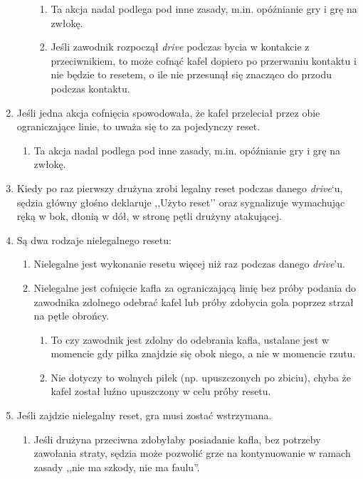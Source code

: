 \documentclass[11pt,a4paper]{article}
\begin{document}
\begin{enumerate}
\begin{enumerate}
    \begin{enumerate}
    
    \item
      Ta akcja nadal podlega pod inne zasady, m.in. opóźnianie gry i grę
      na zwłokę.
    \item
      Jeśli zawodnik rozpoczął \emph{drive} podczas bycia w kontakcie z
      przeciwnikiem, to może cofnąć kafel dopiero po przerwaniu kontaktu
      i nie będzie to resetem, o ile nie przesunął się znacząco do
      przodu podczas kontaktu.
    \end{enumerate}
  \end{enumerate}
\item
  Jeśli jedna akcja cofnięcia spowodowała, że kafel przeleciał przez
  obie ograniczające linie, to uważa się to za pojedynczy reset.

  \begin{enumerate}
  
  \item
    Ta akcja nadal podlega pod inne zasady, m.in. opóźnianie gry i grę
    na zwłokę.
  \end{enumerate}
\item
  Kiedy po raz pierwszy drużyna zrobi legalny reset podczas danego
  \emph{drive}`u, sędzia główny głośno deklaruje ,,Użyto reset'' oraz
  sygnalizuje wymachując ręką w bok, dłonią w dół, w stronę pętli
  drużyny atakującej.
\item
  Są dwa rodzaje nielegalnego resetu:

  \begin{enumerate}
  
  \item
    Nielegalne jest wykonanie resetu więcej niż raz podczas danego
    \emph{drive}'u.
  \item
    Nielegalne jest cofnięcie kafla za ograniczającą linię bez próby
    podania do zawodnika zdolnego odebrać kafel lub próby zdobycia gola
    poprzez strzał na pętle obrońcy.

    \begin{enumerate}
    
    \item
      To czy zawodnik jest zdolny do odebrania kafla, ustalane jest w
      momencie gdy piłka znajdzie się obok niego, a nie w momencie
      rzutu.
    \item
      Nie dotyczy to wolnych piłek (np. upuszczonych po zbiciu), chyba
      że kafel został luźno upuszczony w celu próby resetu.
    \end{enumerate}
  \end{enumerate}
\item
  Jeśli zajdzie nielegalny reset, gra musi zostać wstrzymana.

  \begin{enumerate}
  
  \item
    Jeśli drużyna przeciwna zdobyłaby posiadanie kafla, bez potrzeby
    zawołania straty, sędzia może pozwolić grze na kontynuowanie w
    ramach zasady ,,nie ma szkody, nie ma faulu''.
  \end{enumerate}
\end{enumerate}
\end{document}
